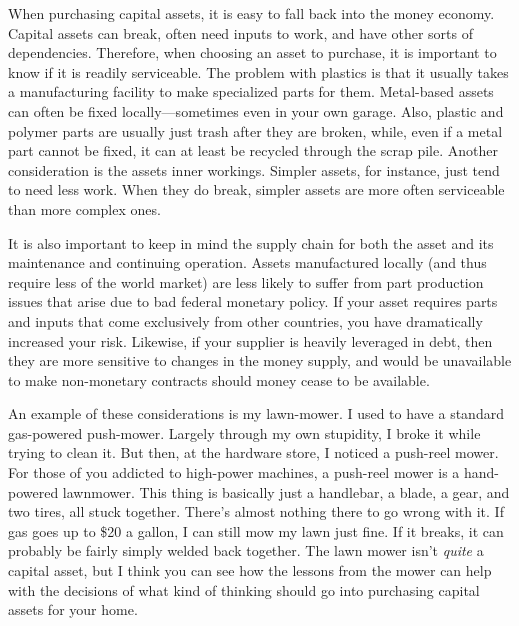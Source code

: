 When purchasing capital assets, it is easy to fall back into the money
economy. Capital assets can break, often need inputs to work, and have
other sorts of dependencies. Therefore, when choosing an asset to
purchase, it is important to know if it is readily serviceable. The
problem with plastics is that it usually takes a manufacturing facility
to make specialized parts for them. Metal-based assets can often be
fixed locally—sometimes even in your own garage. Also, plastic and
polymer parts are usually just trash after they are broken, while, even
if a metal part cannot be fixed, it can at least be recycled through
the scrap pile.  Another consideration is the asset{\textquotesingle}s
inner workings.  Simpler assets, for instance, just tend to need less
work.  When they do break, simpler assets are more often serviceable
than more complex ones.  

It is also important to keep in mind the supply chain for both the asset
and its maintenance and continuing operation.  Assets manufactured
locally (and thus require less of the world market) are less likely to
suffer from part production issues that arise due to bad federal
monetary policy.  If your asset requires parts and inputs that come
exclusively from other countries, you have dramatically increased your
risk.  Likewise, if your supplier is heavily leveraged in debt, then
they are more sensitive to changes in the money supply, and would be
unavailable to make non-monetary contracts should money cease to be
available.  

An example of these considerations is my lawn-mower. I used to have a
standard gas-powered push-mower. Largely through my own stupidity, I
broke it while trying to clean it. But then, at the hardware store, I
noticed a push-reel mower. For those of you addicted to high-power
machines, a push-reel mower is a hand-powered lawnmower. This thing is
basically just a handlebar, a blade, a gear, and two tires, all stuck
together. There’s almost nothing there to go wrong with it. If gas goes
up to \$20 a gallon, I can still mow my lawn just fine.  If it breaks,
it can probably be fairly simply welded back together. The lawn mower
isn’t \textit{quite} a capital asset, but I think you can see how the
lessons from the mower can help with the decisions of what kind of
thinking should go into purchasing capital assets for your home.


